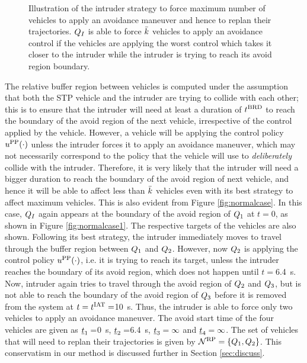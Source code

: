 \begin{figure}[H]
\begin{subfigure}{.5\columnwidth}
  \subcaption{}
  \label{fig:worstcase4}
\end{subfigure}
\caption{Illustration of the intruder strategy to force maximum number of vehicles to apply an avoidance maneuver and hence to replan their trajectories. $Q_{I}$ is able to force $\bar{k}$ vehicles to apply an avoidance control if the vehicles are applying the worst control which takes it closer to the intruder while the intruder is trying to reach its avoid region boundary. }
\label{fig:worstcase}
\end{figure}

The relative buffer region between vehicles is computed under the assumption that both the STP vehicle and the intruder are trying to collide with each other; this is to ensure that the intruder will need at least a duration of $t^\text{BRD}$ to reach the boundary of the avoid region of the next vehicle, irrespective of the control applied by the vehicle. However, a vehicle will be applying the control policy $u^{\text{PP}}(\cdot)$ unless the intruder forces it to apply an avoidance maneuver, which may not necessarily correspond to the policy that the vehicle will use to \textit{deliberately} collide with the intruder. Therefore, it is very likely that the intruder will need a bigger duration to reach the boundary of the avoid region of next vehicle, and hence it will be able to affect less than $\bar{k}$ vehicles even with its best strategy to affect maximum vehicles. This is also evident from Figure \ref{fig:normalcase}. In this case, $Q_{I}$ again appears at the boundary of the avoid region of $Q_1$ at $t=0$, as shown in Figure \ref{fig:normalcase1}. The respective targets of the vehicles are also shown. Following its best strategy, the intruder immediately moves to travel through the buffer region between $Q_1$ and $Q_2$. However, now $Q_2$ is applying the control policy $u^{\text{PP}}(\cdot)$, i.e. it is trying to reach its target, unless the intruder reaches the boundary of its avoid region, which does not happen until $t= $\SI{6.4}{\s}. Now, intruder again tries to travel through the avoid region of $Q_2$ and $Q_3$, but is not able to reach the boundary of the avoid region of $Q_3$ before it is removed from the system at $t=t^\text{IAT}=$\SI{10}{\s}. Thus, the intruder is able to force only two vehicles to apply an avoidance maneuver. The avoid start time of the four vehicles are given as $\underline{t}_1 = $\SI{0}{\s}, $\underline{t}_2 = $\SI{6.4}{\s}, $\underline{t}_3 = \infty$ and $\underline{t}_4 = \infty$. The set of vehicles that will need to replan their trajectories is given by $\mathcal{N}^\text{RP} = \{Q_1, Q_2\}$. This conservatism in our method is discussed further in Section \ref{sec:discuss}.
